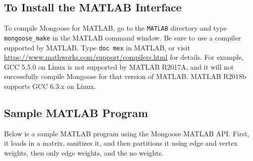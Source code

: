 \documentclass[letter]{article}
\begin{document}
\subsection{To Install the MATLAB Interface}

To compile Mongoose for MATLAB, go to the \texttt{MATLAB} directory and type
\texttt{mongoose\_make} in the MATLAB command window.  Be sure to use a
compiler supported by MATLAB.  Type \texttt{doc mex} in MATLAB, or visit
\url{https://www.mathworks.com/support/compilers.html} for details.  For
example, GCC 5.5.0 on Linux is not supported by MATLAB R2017A, and it will not
successfully compile Mongoose for that version of MATLAB.  MATLAB R2018b
supports GCC 6.3.x on Linux.

\subsection{Sample MATLAB Program}

Below is a sample MATLAB program using the Mongoose MATLAB API. First, it loads in a matrix, sanitizes it, and then partitions it using edge and vertex weights, then only edge weights, and the no weights.
\end{document}
